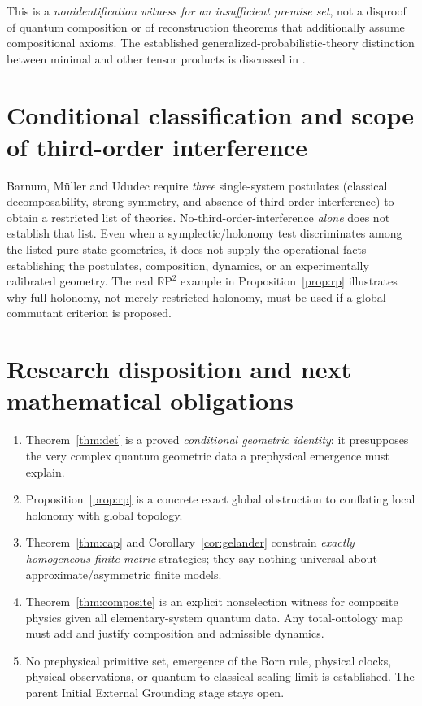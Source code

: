 \documentclass[11pt,letterpaper]{article}
\newcommand{\RP}{\mathbb R\mathrm P}
\begin{document}
This is a \emph{nonidentification witness for an insufficient premise set}, not a disproof of quantum composition or of reconstruction theorems that additionally assume compositional axioms. The established generalized-probabilistic-theory distinction between minimal and other tensor products is discussed in \cite{eftaxias}.

\section{Conditional classification and scope of third-order interference}
Barnum, M\"uller and Ududec \cite{barnum} require \emph{three} single-system postulates (classical decomposability, strong symmetry, and absence of third-order interference) to obtain a restricted list of theories. No-third-order-interference \emph{alone} does not establish that list. Even when a symplectic/holonomy test discriminates among the listed pure-state geometries, it does not supply the operational facts establishing the postulates, composition, dynamics, or an experimentally calibrated geometry. The real \(\RP^2\) example in Proposition~\ref{prop:rp} illustrates why full holonomy, not merely restricted holonomy, must be used if a global commutant criterion is proposed.

\section{Research disposition and next mathematical obligations}
\begin{enumerate}[leftmargin=1.7em,itemsep=1pt]
\item Theorem~\ref{thm:det} is a proved \emph{conditional geometric identity}: it presupposes the very complex quantum geometric data a prephysical emergence must explain.
\item Proposition~\ref{prop:rp} is a concrete exact global obstruction to conflating local holonomy with global topology.
\item Theorem~\ref{thm:cap} and Corollary~\ref{cor:gelander} constrain \emph{exactly homogeneous finite metric} strategies; they say nothing universal about approximate/asymmetric finite models.
\item Theorem~\ref{thm:composite} is an explicit nonselection witness for composite physics given all elementary-system quantum data. Any total-ontology map must add and justify composition and admissible dynamics.
\item No prephysical primitive set, emergence of the Born rule, physical clocks, physical observations, or quantum-to-classical scaling limit is established. The parent Initial External Grounding stage stays open.
\end{enumerate}
\end{document}
